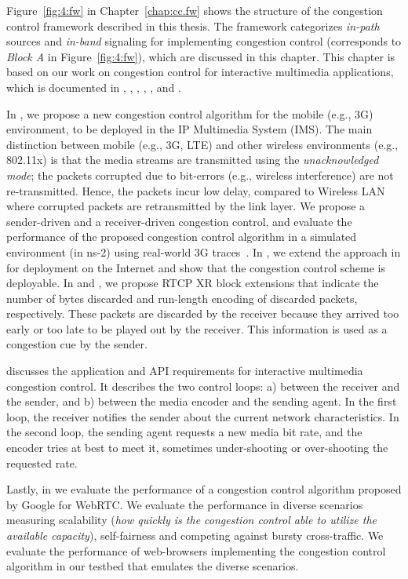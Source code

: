 Figure~\ref{fig:4:fw} in Chapter~\ref{chap:cc.fw} shows the structure of the
congestion control framework described in this thesis. The framework
categorizes \emph{in-path} sources and \emph{in-band} signaling for
implementing congestion control (corresponds to \emph{Block A} in
Figure~\ref{fig:4:fw}), which are discussed in this chapter. This chapter is
based on our work on congestion control for interactive multimedia
applications, which is documented in , ,
, \cite{rfc7097},
\cite{draft.xr.bytes.discarded}, \cite{singh:2010.thesis} and
\cite{Singh:control.loops.api}.

In , we propose a new congestion control algorithm for the
mobile (e.g., 3G) environment, to be deployed in the IP Multimedia System
(IMS). The main distinction between mobile (e.g., 3G, LTE) and other wireless
environments (e.g., 802.11x) is that the media streams are transmitted using
the \emph{unacknowledged mode}; the packets corrupted due to bit-errors (e.g.,
wireless interference) are not re-transmitted. Hence, the packets incur low
delay, compared to Wireless LAN where corrupted packets are retransmitted by
the link layer. We propose a sender-driven and a receiver-driven congestion
control, and evaluate the performance of the proposed congestion control
algorithm in a simulated environment (in ns-2) using real-world 3G
traces~\cite{s4.eval.bitrate, 3gppSim}. In , we extend the
approach in  for deployment on the Internet and show that the
congestion control scheme is deployable. In \cite{rfc7097} and
\cite{draft.xr.bytes.discarded}, we propose RTCP XR block extensions that
indicate the number of bytes discarded and run-length encoding of discarded
packets, respectively. These packets are discarded by the receiver because
they arrived too early or too late to be played out by the receiver. This
information is used as a congestion cue by the sender.

\cite{Singh:control.loops.api} discusses the application and API requirements
for interactive multimedia congestion control. It describes the two control
loops: a) between the receiver and the sender, and b) between the media
encoder and the sending agent. In the first loop, the receiver notifies the
sender about the current network characteristics. In the second loop, the
sending agent requests a new media bit rate, and the encoder tries at best to
meet it, sometimes under-shooting or over-shooting the requested rate.

Lastly, in  we evaluate the performance of a congestion
control algorithm proposed by Google for WebRTC. We evaluate the performance
in diverse scenarios measuring scalability (\emph{how quickly is the
congestion control able to utilize the available capacity}), self-fairness and
competing against bursty cross-traffic. We evaluate the performance of
web-browsers implementing the congestion control algorithm in our testbed that
emulates the diverse scenarios.

